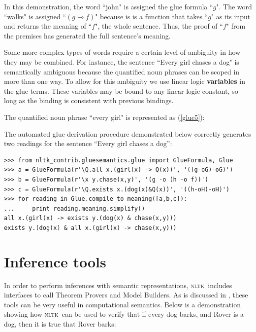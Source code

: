 \documentclass[11pt,a4paper]{article}
\newcommand{\NLTK}{\textsc{nltk}}
\begin{document}
In this demonstration, the word ``john" is assigned the glue formula
``$g$".  The word ``walks" is assigned ``$(g \multimap f)$" because is
is a function that takes ``$g$" as its input and returns the meaning
of ``$f$", the whole sentence.  Thus, the proof of ``$f$" from the
premises has generated the full sentence's meaning. 


Some more complex types of words require a certain level of ambiguity in how they may be combined.  For instance, the sentence ``Every girl chases a dog" is semantically ambiguous because the quantified noun phrases can be scoped in more than one way.  To allow for this ambiguity we use linear logic \textbf{variables} in the glue terms.  These variables may be bound to any linear logic constant, so long as the binding is consistent with previous bindings.

The quantified noun phrase ``every girl" is represented as (\ref{glue5}):


The automated glue derivation procedure demonstrated below correctly generates two readings for the sentence ``Every girl chases a dog'':

\begin{verbatim}
>>> from nltk_contrib.gluesemantics.glue import GlueFormula, Glue
>>> a = GlueFormula(r'\Q.all x.(girl(x) -> Q(x))', '((g-oG)-oG)')
>>> b = GlueFormula(r'\x y.chase(x,y)', '(g -o (h -o f))')
>>> c = GlueFormula(r'\Q.exists x.(dog(x)&Q(x))', '((h-oH)-oH)')
>>> for reading in Glue.compile_to_meaning([a,b,c]):
...     print reading.meaning.simplify()
all x.(girl(x) -> exists y.(dog(x) & chase(x,y)))
exists y.(dog(x) & all x.(girl(x) -> chase(x,y)))
\end{verbatim}


\section{Inference tools}
In order to perform inferences with semantic representations, \NLTK\
includes interfaces to call Theorem Provers and Model Builders.  As is
discussed in \cite{BB}, these tools can be very useful in
computational semantics.  Below is a demonstration showing how \NLTK\
can be used to verify that if every dog barks, and Rover is a dog,
then it is true that Rover barks:
\end{document}

